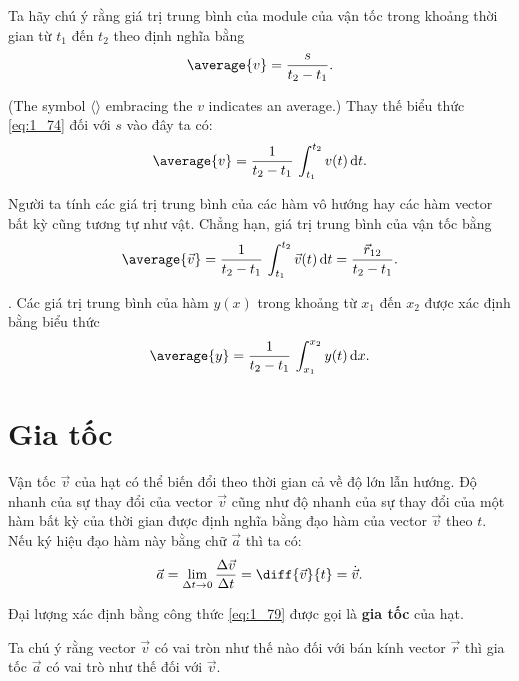 Ta hãy chú ý rằng giá trị trung bình của module của vận tốc trong khoảng thời gian từ $t_1$ đến  $t_2$ theo định nghĩa bằng
\begin{equation*}
\average{v} = \frac{s}{t_2-t_1}.
\end{equation*}

\noindent
(The symbol $\langle\rangle$ embracing the $v$ indicates an average.) Thay thế biểu thức \eqref{eq:1_74} đối với $s$ vào đây ta có:
\begin{equation}\label{eq:1_76}
\average{v} = \frac{1}{t_2-t_1}\,\int_{t_1}^{t_2}v(t)\,\mathrm{d}t.
\end{equation}

\noindent
Người ta tính các giá trị trung bình của các hàm vô hướng hay các hàm vector bất kỳ cũng tương tự như vật. Chẳng hạn, giá trị trung bình của vận tốc bằng
\begin{equation}\label{eq:1_77}
\average{\vec{v}} = \frac{1}{t_2-t_1}\,\int_{t_1}^{t_2}\vec{v}(t)\,\mathrm{d}t = \frac{\vec{r}_{12}}{t_2-t_1}.
\end{equation}

. Các giá trị trung bình của hàm $y(x)$ trong khoảng từ $x_1$ đến $x_2$ được xác định bằng biểu thức
\begin{equation}\label{eq:1_78}
\average{y} = \frac{1}{t_2-t_1}\,\int_{x_1}^{x_2}y(t)\,\mathrm{d}x.
\end{equation}

\section{Gia tốc}\label{sec:1_4}

Vận tốc $\vec{v}$ của hạt có thể biến đổi theo thời gian cả về độ lớn lẫn hướng. Độ nhanh của sự thay đổi của vector $\vec{v}$ cũng như độ nhanh của sự thay đổi của một hàm bất kỳ của thời gian được định nghĩa bằng đạo hàm của vector $\vec{v}$ theo $t$. Nếu ký hiệu đạo hàm này bằng chữ $\vec{a}$ thì ta có:
\begin{equation}\label{eq:1_79}
\vec{a} = \lim_{\Delta t\to 0}\frac{\Delta\vec{v}}{\Delta t} = \diff{\vec{v}}{t} = \dot{\vec{v}}.
\end{equation}

\noindent
Đại lượng xác định bằng công thức \eqref{eq:1_79} được gọi là \textbf{gia tốc} của hạt.

Ta chú ý rằng vector $\vec{v}$ có vai tròn như thế nào đối với bán kính vector $\vec{r}$ thì gia tốc $\vec{a}$ có vai trò như thế đối với $\vec{v}$.

